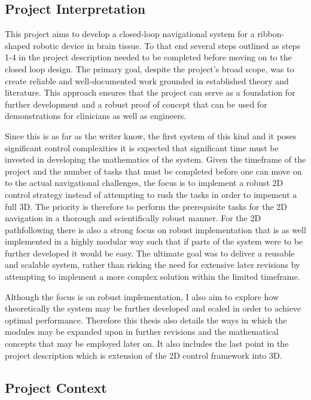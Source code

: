 \subsection{Project Interpretation}

This project aims to develop a closed-loop navigational system for a ribbon-shaped robotic device in brain tissue. To that end several steps outlined as steps 1-4 in the project description needed to be completed before moving on to the closed loop design. The primary
goal, despite the project’s broad scope, was to create reliable and well-documented work grounded in established theory and literature. This approach ensures that the project can serve as a foundation for further development and a robust proof of concept that can be used for demonstrations for clinicians as well as engineers.

Since this is as far as the writer know, the first system of this kind and it poses significant control complexities it is expected that significant time must be invested in developing the mathematics of the system. Given the timeframe of the project and the number of tasks that must be completed before one can move on to the actual navigational challenges, the focus is to implement a robust 2D control strategy instead of attempting to rush the tasks in order to impement a full 3D. The priority is therefore to perform the prerequisite tasks for the 2D  navigation in a thorough and scientifically robust manner. For the 2D pathfollowing there is also a strong focus on robust implementation that is as well implemented in a highly modular way such that if parts of the system were to be further developed it would be easy. The ultimate goal was to deliver a reusable and scalable system, rather than risking the need for extensive later revisions by attempting to implement a more complex solution within the limited timeframe.

Although the focus is on robust implementation, I also aim to explore how theoretically the system may be further developed and scaled in order to achieve optimal performance. Therefore this thesis also details the ways in which the modules may be expanded upon in further revisions and the mathematical concepts that may be employed later on. It also includes the last point in the project description which is extension of the 2D control framework into 3D.



\subsection{Project Context}

